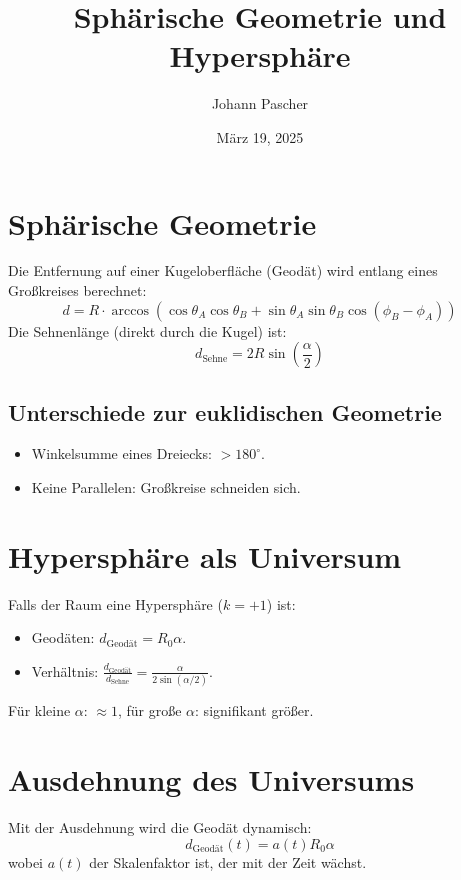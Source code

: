 \documentclass[a4paper,12pt]{article}
\title{Sphärische Geometrie und Hypersphäre}
\author{Johann Pascher}
\date{März 19, 2025}
\begin{document}
	
	\maketitle
	
	\section{Sphärische Geometrie}
	Die Entfernung auf einer Kugeloberfläche (Geodät) wird entlang eines Großkreises berechnet:
	\[
	d = R \cdot \arccos(\cos\theta_A \cos\theta_B + \sin\theta_A \sin\theta_B \cos(\phi_B - \phi_A))
	\]
	Die Sehnenlänge (direkt durch die Kugel) ist:
	\[
	d_{\text{Sehne}} = 2R \sin\left(\frac{\alpha}{2}\right)
	\]
	
	\subsection{Unterschiede zur euklidischen Geometrie}
	\begin{itemize}
		\item Winkelsumme eines Dreiecks: \(> 180^\circ\).
		\item Keine Parallelen: Großkreise schneiden sich.
	\end{itemize}
	
	\section{Hypersphäre als Universum}
	Falls der Raum eine Hypersphäre (\(k = +1\)) ist:
	\begin{itemize}
		\item Geodäten: \(d_{\text{Geodät}} = R_0 \alpha\).
		\item Verhältnis: \(\frac{d_{\text{Geodät}}}{d_{\text{Sehne}}} = \frac{\alpha}{2 \sin(\alpha/2)}\).
	\end{itemize}
	Für kleine \(\alpha\): \(\approx 1\), für große \(\alpha\): signifikant größer.
	
	\section{Ausdehnung des Universums}
	Mit der Ausdehnung wird die Geodät dynamisch:
	\[
	d_{\text{Geodät}}(t) = a(t) R_0 \alpha
	\]
	wobei \(a(t)\) der Skalenfaktor ist, der mit der Zeit wächst.
	
\end{document}
